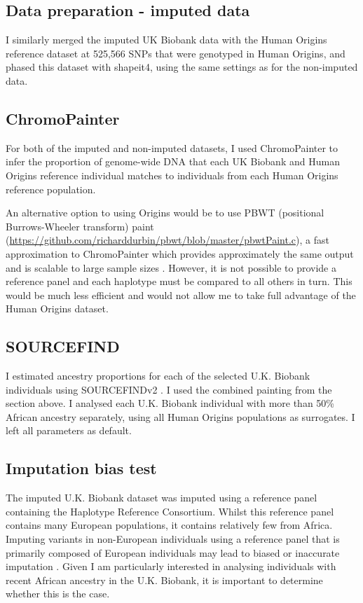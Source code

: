 \subsection{Data preparation - imputed data}

I similarly merged the imputed UK Biobank data with the Human Origins reference dataset at 525,566 SNPs that were genotyped in Human Origins, and phased this dataset with shapeit4, using the same settings as for the non-imputed data.

\subsection{ChromoPainter}

For both of the imputed and non-imputed datasets, I used ChromoPainter to infer the proportion of genome-wide DNA that each UK Biobank and Human Origins reference individual matches to individuals from each Human Origins reference population. 

An alternative option to using Origins would be to use PBWT (positional Burrows-Wheeler transform) paint (\url{https://github.com/richarddurbin/pbwt/blob/master/pbwtPaint.c}), a fast approximation to ChromoPainter which provides approximately the same output and is scalable to large sample sizes \cite{byrne2020dutch}. However, it is not possible to provide a reference panel and each haplotype must be compared to all others in turn. This would be much less efficient and would not allow me to take full advantage of the Human Origins dataset. 

\subsection{SOURCEFIND}

I estimated ancestry proportions for each of the selected U.K. Biobank individuals using SOURCEFINDv2 \cite{Chacon-Duque2018}. I used the combined painting from the section above. I analysed each U.K. Biobank individual with more than 50\% African ancestry separately, using all Human Origins populations as surrogates. I left all parameters as default. 

\subsection{Imputation bias test} \label{sec:ImputationBiasTest}

The imputed U.K. Biobank dataset was imputed using a reference panel containing the Haplotype Reference Consortium. Whilst this reference panel contains many European populations, it contains relatively few from Africa. Imputing variants in non-European individuals using a reference panel that is primarily composed of European individuals may lead to biased or inaccurate imputation \cite{huang2011haplotype}. Given I am particularly interested in analysing individuals with recent African ancestry in the U.K. Biobank, it is important to determine whether this is the case.  

